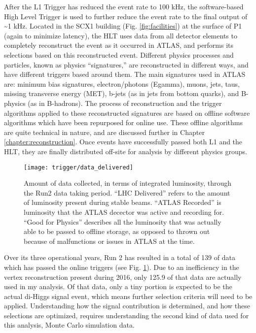         After the L1 Trigger has reduced the event rate to 100 kHz, the software-based High Level Trigger is used to further reduce the event rate to the final output of \textasciitilde 1 kHz.
        Located in the SCX1 building (Fig. \ref{fig:facilities}) at the surface of P1 (again to minimize latency), the HLT uses data from all detector elements to completely reconstruct the event as it occurred in ATLAS, and performs its selections based on this reconstructed event.
        Different physics processes and particles, known as physics ``signatures,'' are reconstructed in different ways, and have different triggers based around them. 
        The main signatures used in ATLAS are: minimum bias signatures, electron/photons (Egamma), muons, jets, taus, missing transverse energy (MET), b-jets (as in jets from bottom quarks), and B-physics (as in B-hadrons).
        The process of reconstruction and the trigger algorithms applied to these reconstructed signatures are based on offline software algorithms which have been repurposed for online use.
        These offline algorithms are quite technical in nature, and are discussed further in Chapter \ref{chapter:reconstruction}.
        Once events have successfully passed both L1 and the HLT, they are finally distributed off-site for analysis by different physics groups.

        \begin{figure}[h]
            \texttt{[image: trigger/data\_delivered]}
            \caption{Amount of data collected, in terms of integrated luminosity,
                through the Run2 data taking period\cite{data_quality}.
                ``LHC Delivered'' refers to the amount of luminosity present during stable beams.
                ``ATLAS Recorded'' is luminosity that the ATLAS decector was active and recording for.
                ``Good for Physics'' describes all the luminosity that was actually able to be passed to offline storage,
                    as opposed to thrown out because of malfunctions or issues in ATLAS at the time.
            }
            \label{fig:data_delivered}
        \end{figure}

        Over its three operational years, Run 2 has resulted in a total of 139 \ifb of data which has passed the online triggers
            (see Fig. \ref{fig:data_delivered}).
        Due to an inefficiency in the vertex reconstruction present during 2016,
            only 125.9 \ifb of that data are actually used in my analysis.
        Of that data, only a tiny portion is expected to be the actual di-Higgs signal event,
            which means further selection criteria will need to be applied.
        Understanding how the signal contribution is determined, and how these selections are optimized,
            requires understanding the second kind of data used for this analysis, Monte Carlo simulation data.


